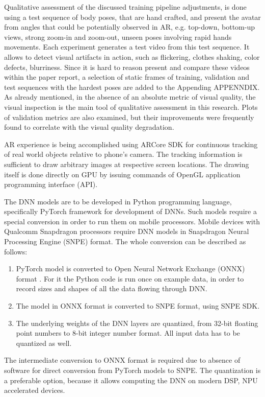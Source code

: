 Qualitative assessment of the discussed training pipeline adjustments, is done using a test sequence of body poses, that are hand crafted, and present the avatar from angles that could be potentially observed in AR, e.g. top-down, bottom-up views, strong zoom-in and zoom-out, unseen poses involving rapid hands movements. Each experiment generates a test video from this test sequence. It allows to detect visual artifacts in action, such as flickering, clothes shaking, color defects, blurriness. Since it is hard to reason present and compare these videos within the paper report, a selection of static frames of training, validation and test sequences with the hardest poses are added to the Appending \alert{APPENNDIX}. As already mentioned, in the absence of an absolute metric of visual quality, the visual inspection is the main tool of qualitative assessment in this research. Plots of validation metrics are also examined, but their improvements were frequently found to correlate with the visual quality degradation.


AR experience is being accomplished using ARCore SDK for continuous tracking of real world objects relative to phone's camera. The tracking information is sufficient to draw arbitrary images at respective screen locations. The drawing itself is done directly on GPU by issuing commands of OpenGL application programming interface (API).

The DNN models are to be developed in Python programming language, specifically PyTorch framework for development of DNNs. Such models require a special conversion in order to run them on mobile processors.  Mobile devices with Qualcomm Snapdragon processors require DNN models in Snapdragon Neural Processing Engine (SNPE) format. The whole conversion can be described as follows:
\begin{enumerate}
	\item  PyTorch model is converted to Open Neural Network Exchange (ONNX) format . For it the Python code is run once on example data, in order to record sizes and shapes of all the data flowing through DNN. 
	\item The model in ONNX format is converted to SNPE format, using SNPE SDK. 
	\item The underlying weights of the DNN layers are quantized, from 32-bit floating point numbers to 8-bit integer number format. All input data has to be quantized as well.
\end{enumerate}

The intermediate conversion to ONNX format is required due to absence of software for direct conversion from PyTorch models to SNPE. The quantization is a preferable option, because it allows computing the DNN on modern DSP, NPU accelerated devices.

